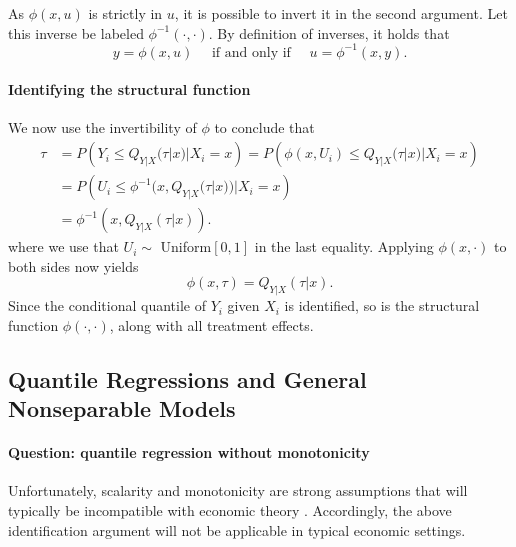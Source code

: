    As $\phi(x, u)$ is strictly in $u$, it is possible to invert it in the second argument. Let this inverse be labeled $\phi^{-1}(\cdot, \cdot)$. By definition of inverses, it holds that 
   \begin{equation}
   	 y = \phi(x, u) \quad \text{ if and only if }\quad u = \phi^{-1}(x, y).
   \end{equation}
   
   
   \paragraph{Identifying the structural function}
   
   We now use the invertibility of $\phi$ to conclude that
   \begin{align}
   	\tau & = P\left( Y_i\leq Q_{Y|X}(\tau|x)|X_i=x\right) = P\left(  \phi(x, U_i)\leq Q_{Y|X}(\tau|x)|X_i=x\right)\\
   	& = P\left( U_i\leq \phi^{-1}(x, Q_{Y|X}(\tau|x))|X_i=x \right)\\
   	& = \phi^{-1}(x, Q_{Y|X}(\tau|x)).
   \end{align}
   where we use that $U_i\sim$  Uniform$[0, 1]$ in the last equality.   Applying $\phi(x, \cdot)$ to both sides now yields
   \begin{equation}\label{quantile:equation:scalarity_identification_quantile}
   	 \phi(x, \tau) =  Q_{Y|X}(\tau|x).
   \end{equation}
   Since the conditional quantile of $Y_i$ given $X_i$ is identified, so is the structural function $\phi(\cdot, \cdot)$, along with all treatment effects.
 
 
 
 \subsection{Quantile Regressions and General Nonseparable Models}
 
 \paragraph{Question: quantile regression without monotonicity}
 
 Unfortunately, scalarity and monotonicity are strong assumptions that will typically be incompatible with economic theory \citep{Hoderlein2007}.
 Accordingly, the above identification argument will not be applicable in typical economic settings.
 
